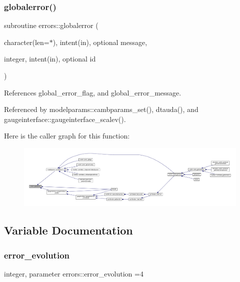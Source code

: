 \subsubsection{\texorpdfstring{globalerror()}{globalerror()}}
{\footnotesize\ttfamily subroutine errors\+::globalerror (\begin{DoxyParamCaption}\item[{character(len=$\ast$), intent(in), optional}]{message,  }\item[{integer, intent(in), optional}]{id }\end{DoxyParamCaption})}



References global\+\_\+error\+\_\+flag, and global\+\_\+error\+\_\+message.



Referenced by modelparams\+::cambparams\+\_\+set(), dtauda(), and gaugeinterface\+::gaugeinterface\+\_\+scalev().

Here is the caller graph for this function\+:
\nopagebreak
\begin{figure}[H]
\begin{center}
\leavevmode
\includegraphics[width=350pt]{namespaceerrors_a318b5ebaf7fbc154515be2da7e932943_icgraph}
\end{center}
\end{figure}


\subsection{Variable Documentation}
\mbox{\label{namespaceerrors_a157310f82f1d3896291c10265618ba56}} 
\subsubsection{\texorpdfstring{error\+\_\+evolution}{error\_evolution}}
{\footnotesize\ttfamily integer, parameter errors\+::error\+\_\+evolution =4}



